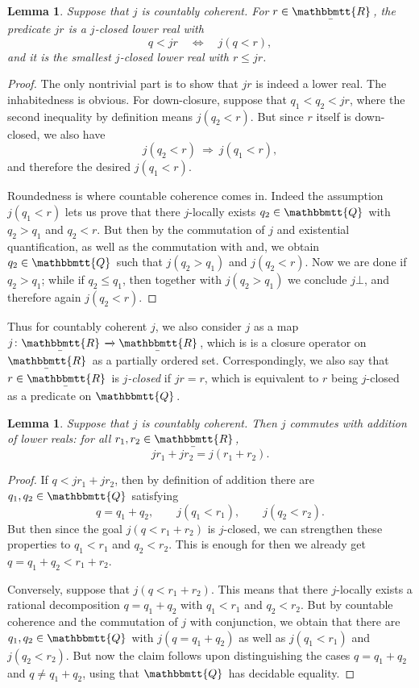 \documentclass[reqno,11pt]{amsproc}
\theoremstyle{plain}
\newtheorem{lemma}[theorem]{Lemma}
\theoremstyle{definition}
\renewcommand{\to}[1][]{\xrightarrow{#1}}
\newcommand{\ubar}[1]{\underaccent{\bar}{#1}}
\newcommand{\internal}[1]{\raisebox{-.03ex}{$\mathbbmtt{#1}$}}
\newcommand{\hs}{\hspace{1pt}}
\newcommand{\tqq}{\internal{Q}\hs}
\newcommand{\trr}{\internal{R}}
\newcommand{\tlrr}{\ubar{\trr}\hs}
\newcommand{\imp}{\Rightarrow}
\numberwithin{equation}{section}
\begin{document}
\begin{lemma}
	Suppose that $j$ is countably coherent. For $r \in \tlrr$, the predicate $jr$ is a $j$-closed lower real with
	\[
		q < jr \quad \Longleftrightarrow \quad j(q < r),
	\]
	and it is the smallest $j$-closed lower real with $r \le jr$.
\end{lemma}

\begin{proof}
	The only nontrivial part is to show that $jr$ is indeed a lower real. The inhabitedness is obvious. For down-closure, suppose that $q_1 < q_2 < jr$, where the second inequality by definition means $j(q_2 < r)$. But since $r$ itself is down-closed, we also have
	\[
		j(q_2 < r) \: \imp \: j(q_1 < r),
	\]
	and therefore the desired $j(q_1 < r)$.

	Roundedness is where countable coherence comes in. Indeed the assumption $j(q_1 < r)$ lets us prove that there $j$-locally exists $q_2 \in \tqq$ with $q_2 > q_1$ and $q_2 < r$. But then by the commutation of $j$ and existential quantification, as well as the commutation with and, we obtain $q_2 \in \tqq$ such that $j(q_2 > q_1)$ and $j(q_2 < r)$. Now we are done if $q_2 > q_1$; while if $q_2 \le q_1$, then together with $j(q_2 > q_1)$ we conclude $j\bot$, and therefore again $j(q_2 < r)$.
\end{proof}

Thus for countably coherent $j$, we also consider $j$ as a map $j \colon \tlrr \to \tlrr$, which is is a closure operator on $\tlrr$ as a partially ordered set. Correspondingly, we also say that $r \in \tlrr$ is \emph{$j$-closed} if $jr = r$, which is equivalent to $r$ being $j$-closed as a predicate on $\tqq$.

\begin{lemma}
	\label{commute_exists_commute_addition}
	Suppose that $j$ is countably coherent. Then $j$ commutes with addition of lower reals: for all $r_1, r_2 \in \tlrr$,
	\[
		jr_1+jr_2=j(r_1+r_2).
	\]
\end{lemma}

\begin{proof}
	If $q < jr_1 + jr_2$, then by definition of addition there are $q_1, q_2 \in \tqq$ satisfying
	\[
		q = q_1 + q_2, \qquad j(q_1 < r_1), \qquad j(q_2 < r_2).
	\]
	But then since the goal $j(q < r_1 + r_2)$ is $j$-closed, we can strengthen these properties to $q_1 < r_1$ and $q_2 < r_2$. This is enough for then we already get $q = q_1 + q_2 < r_1 + r_2$.
	
	Conversely, suppose that $j(q < r_1 + r_2)$. This means that there $j$-locally exists a rational decomposition $q = q_1 + q_2$ with $q_1 < r_1$ and $q_2 < r_2$. But by countable coherence and the commutation of $j$ with conjunction, we obtain that there are $q_1, q_2 \in \tqq$ with $j(q = q_1 + q_2)$ as well as $j(q_1 < r_1)$ and $j(q_2 < r_2)$. But now the claim follows upon distinguishing the cases $q = q_1 + q_2$ and $q \neq q_1 + q_2$, using that $\tqq$ has decidable equality.
\end{proof}
\end{document}
